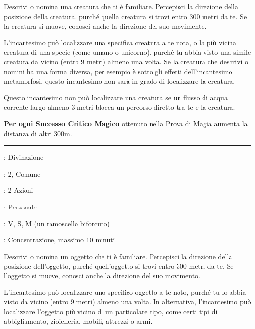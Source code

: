 \begin{multicols}{2}
Descrivi o nomina una creatura che ti è familiare. Percepisci la direzione della posizione della creatura, purché quella creatura si trovi entro 300 metri da te. Se la creatura si muove, conosci anche la direzione del suo movimento.

L'incantesimo può localizzare una specifica creatura a te nota, o la più vicina creatura di una specie (come umano o unicorno), purché tu abbia visto una simile creatura da vicino (entro 9 metri) almeno una volta. Se la creatura che descrivi o nomini ha una forma diversa, per esempio è sotto gli effetti dell'incantesimo metamorfosi, questo incantesimo non sarà in grado di localizzare la creatura.

Questo incantesimo non può localizzare una creatura se un flusso di acqua corrente largo almeno 3 metri blocca un percorso diretto tra te e la creatura.

\textbf{Per ogni Successo Critico Magico} ottenuto nella Prova di Magia aumenta la distanza di altri 300m.

\smallskip\noindent\rule{\linewidth}{2pt} \hypertarget{Localizza Oggetto}{}\smallskip{}
\noindent
\begin{description}[noitemsep, topsep=0pt, parsep=0pt, partopsep=0pt, leftmargin=0cm, labelwidth=2.8cm]
	\item[\textbf{Lista di Magia}]: Divinazione
	\item[\textbf{Livello}]: 2, Comune
	\item[\textbf{T. di Lancio}]: 2 Azioni
	\item[\textbf{Gittata}]: Personale
	\item[\textbf{Componenti}]: V, S, M (un ramoscello biforcuto)
	\item[\textbf{Durata}]: Concentrazione, massimo 10 minuti
\end{description}

Descrivi o nomina un oggetto che ti è familiare. Percepisci la direzione della posizione dell'oggetto, purché quell'oggetto si trovi entro 300 metri da te. Se l'oggetto si muove, conosci anche la direzione del suo movimento.

L'incantesimo può localizzare uno specifico oggetto a te noto, purché tu lo abbia visto da vicino (entro 9 metri) almeno una volta. In alternativa, l'incantesimo può localizzare l'oggetto più vicino di un particolare tipo, come certi tipi di abbigliamento, gioielleria, mobili, attrezzi o armi.


\end{multicols}
